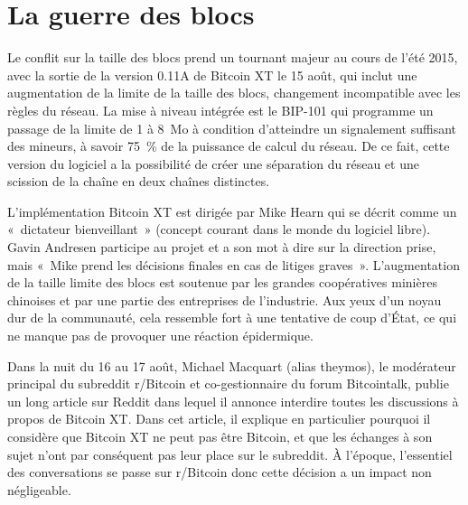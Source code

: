 \section*{La guerre des blocs} %

Le conflit sur la taille des blocs prend un tournant majeur au cours de l'été 2015, avec la sortie de la version 0.11A de Bitcoin XT le 15 août, qui inclut une augmentation de la limite de la taille des blocs, changement incompatible avec les règles du réseau. La mise à niveau intégrée est le BIP-101 qui programme un passage de la limite de 1 à 8~Mo à condition d'atteindre un signalement suffisant des mineurs, à savoir 75~\% de la puissance de calcul du réseau. De ce fait, cette version du logiciel a la possibilité de créer une séparation du réseau et une scission de la chaîne en deux chaînes distinctes.

L'implémentation Bitcoin XT est dirigée par Mike Hearn qui se décrit comme un «~dictateur bienveillant~» (concept courant dans le monde du logiciel libre). Gavin Andresen participe au projet et a son mot à dire sur la direction prise, mais «~Mike prend les décisions finales en cas de litiges graves~». L'augmentation de la taille limite des blocs est soutenue par les grandes coopératives minières chinoises et par une partie des entreprises de l'industrie. Aux yeux d'un noyau dur de la communauté, cela ressemble fort à une tentative de coup d'État, ce qui ne manque pas de provoquer une réaction épidermique.

Dans la nuit du 16 au 17 août, Michael Macquart (alias theymos), le modérateur principal du subreddit r/Bitcoin et co-gestionnaire du forum Bitcointalk, publie un long article sur Reddit dans lequel il annonce interdire toutes les discussions à propos de Bitcoin XT. Dans cet article, il explique en particulier pourquoi il considère que Bitcoin XT ne peut pas être Bitcoin, et que les échanges à son sujet n'ont par conséquent pas leur place sur le subreddit. À l'époque, l'essentiel des conversations se passe sur r/Bitcoin donc cette décision a un impact non négligeable.

